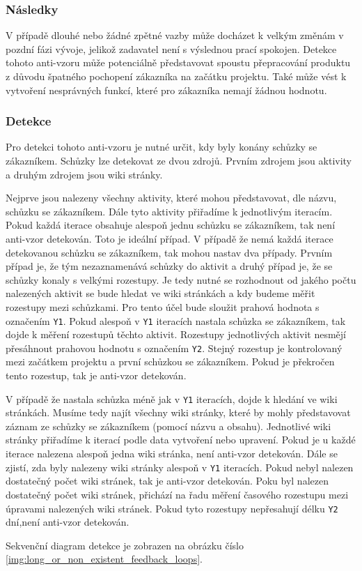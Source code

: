 \documentclass[czech,DP]{thesiskiv}
\begin{document}
\subsubsection{Následky}
V případě dlouhé nebo žádné zpětné vazby může docházet k velkým změnám v pozdní fázi vývoje, jelikož zadavatel není s výslednou prací spokojen. Detekce tohoto anti-vzoru může potenciálně představovat spoustu přepracování produktu z důvodu špatného pochopení zákazníka na začátku projektu. Také může vést k vytvoření nesprávných funkcí, které pro zákazníka nemají žádnou hodnotu.
\subsubsection{Detekce}
Pro detekci tohoto anti-vzoru je nutné určit, kdy byly konány schůzky se zákazníkem. Schůzky lze detekovat ze dvou zdrojů. Prvním zdrojem jsou aktivity a druhým zdrojem jsou wiki stránky.
\par
Nejprve jsou nalezeny všechny aktivity, které mohou představovat, dle názvu, schůzku se zákazníkem. Dále tyto aktivity přiřadíme k jednotlivým iteracím. Pokud každá iterace obsahuje alespoň jednu schůzku se zákazníkem, tak není anti-vzor detekován. Toto je ideální případ. V případě že nemá každá iterace detekovanou schůzku se zákazníkem, tak mohou nastav dva případy. Prvním případ je, že tým nezaznamenává schůzky do aktivit a druhý případ je, že se schůzky konaly s velkými rozestupy. Je tedy nutné se rozhodnout od jakého počtu nalezených aktivit se bude hledat ve wiki stránkách a kdy budeme měřit rozestupy mezi schůzkami. Pro tento účel bude sloužit prahová hodnota s označením \texttt{Y1}. Pokud alespoň v \texttt{Y1} iteracích nastala schůzka se zákazníkem, tak dojde k měření rozestupů těchto aktivit. Rozestupy jednotlivých aktivit nesmějí přesáhnout prahovou hodnotu s označením \texttt{Y2}. Stejný rozestup je kontrolovaný mezi začátkem projektu a první schůzkou se zákazníkem. Pokud je překročen tento rozestup, tak je anti-vzor detekován.
\par
V případě že nastala schůzka méně jak v \texttt{Y1} iteracích, dojde k hledání ve wiki stránkách. Musíme tedy najít všechny wiki stránky, které by mohly představovat záznam ze schůzky se zákazníkem (pomocí názvu a obsahu). Jednotlivé wiki stránky přiřadíme k iterací podle data vytvoření nebo upravení. Pokud je u každé iterace nalezena alespoň jedna wiki stránka, není anti-vzor detekován. Dále se zjistí, zda byly nalezeny wiki stránky alespoň v \texttt{Y1} iteracích. Pokud nebyl nalezen dostatečný počet wiki stránek, tak je anti-vzor detekován. Poku byl nalezen dostatečný počet wiki stránek, přichází na řadu měření časového rozestupu mezi úpravami nalezených wiki stránek. Pokud tyto rozestupy nepřesahují délku \texttt{Y2} dní,není anti-vzor detekován.
\par
Sekvenční diagram detekce je zobrazen na obrázku číslo \ref{img:long_or_non_existent_feedback_loops}.
\end{document}
